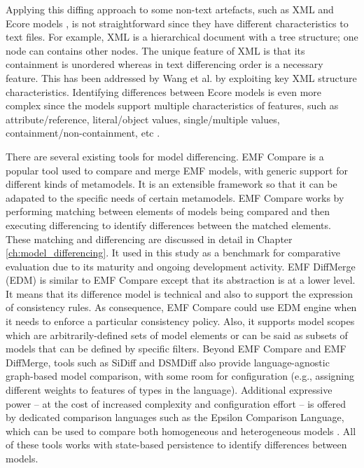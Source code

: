 Applying this diffing approach to some non-text artefacts, such as XML \cite{w3c-xml} and Ecore models \cite{steinberg2008emf}, is not straightforward since they have different characteristics to text files. For example, XML is a hierarchical document with a tree structure; one node can contains other nodes. The unique feature of XML is that its containment is  unordered whereas in text differencing order is a necessary feature. This has been addressed by Wang et al. \cite{wang2003xdiff} by exploiting key XML  structure characteristics. Identifying differences between Ecore models is even more complex since the models support multiple characteristics of features, such as attribute/reference, literal/object values, single/multiple values, containment/non-containment, etc \cite{steinberg2008emf}. 

There are several existing tools for model differencing. 
EMF Compare \cite{emfcompare2018developer} is a popular tool used to compare and merge EMF models, with generic support for different kinds of metamodels. It is an extensible framework so that it can be adapated to the specific needs of certain metamodels. EMF Compare works by performing matching between elements of models being compared and then executing differencing to identify differences between the matched elements. These matching and differencing are discussed in detail in Chapter \ref{ch:model_differencing}. It used in this study as a benchmark for comparative evaluation due to its maturity and ongoing development activity. EMF DiffMerge (EDM) \cite{eclipse2019emfdiffmerge} is similar to EMF Compare except that its abstraction is at a lower level. It means that its difference model is technical and also to support the expression of consistency rules. As consequence, EMF Compare could use EDM engine when it needs to enforce a particular consistency policy. Also, it supports model scopes which are arbitrarily-defined sets of model elements or can be said as subsets of models that can be defined by specific filters. Beyond EMF Compare and EMF DiffMerge, tools such as SiDiff \cite{Treude2007SiDiff} and DSMDiff \cite{lin2009dsmdiff} also provide language-agnostic graph-based model comparison, with some room for configuration (e.g., assigning different weights to features of types in the language). Additional expressive power -- at the cost of increased complexity and configuration effort -- is offered by dedicated comparison languages such as the Epsilon Comparison Language, which can be used to compare both homogeneous and heterogeneous models \cite{kolovos2009ecl}. All of these tools works with state-based persistence to identify differences between models.

